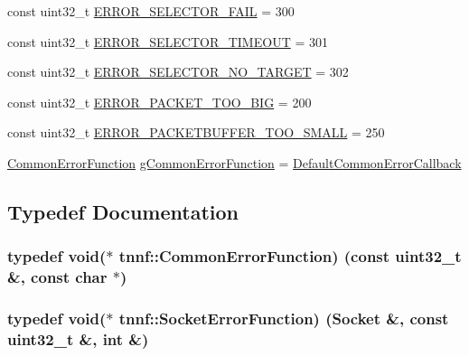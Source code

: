 \begin{DoxyCompactItemize}
\item 
const uint32\+\_\+t \hyperlink{namespacetnnf_af662f0c35b0eb75729eb6ae1ae3e48df}{E\+R\+R\+O\+R\+\_\+\+S\+E\+L\+E\+C\+T\+O\+R\+\_\+\+F\+A\+I\+L} = 300
\item 
const uint32\+\_\+t \hyperlink{namespacetnnf_a1e6246ce42ad3d14b27cddb40dbe2e92}{E\+R\+R\+O\+R\+\_\+\+S\+E\+L\+E\+C\+T\+O\+R\+\_\+\+T\+I\+M\+E\+O\+U\+T} = 301
\item 
const uint32\+\_\+t \hyperlink{namespacetnnf_a2a52f505fa0fc0f44aa4277b2f2a4eaa}{E\+R\+R\+O\+R\+\_\+\+S\+E\+L\+E\+C\+T\+O\+R\+\_\+\+N\+O\+\_\+\+T\+A\+R\+G\+E\+T} = 302
\item 
const uint32\+\_\+t \hyperlink{namespacetnnf_aad4f66acf18647decd893947c7ddaea7}{E\+R\+R\+O\+R\+\_\+\+P\+A\+C\+K\+E\+T\+\_\+\+T\+O\+O\+\_\+\+B\+I\+G} = 200
\item 
const uint32\+\_\+t \hyperlink{namespacetnnf_a21a988a81b1093f0320978991010a99f}{E\+R\+R\+O\+R\+\_\+\+P\+A\+C\+K\+E\+T\+B\+U\+F\+F\+E\+R\+\_\+\+T\+O\+O\+\_\+\+S\+M\+A\+L\+L} = 250
\item 
\hyperlink{namespacetnnf_a8582fd7399bd6b4f1bc80f600e0dc889}{Common\+Error\+Function} \hyperlink{namespacetnnf_a09f00feabd8f2363f85eaa64d9f0a1bb}{g\+Common\+Error\+Function} = \hyperlink{namespacetnnf_a38b2a35754cac26ac7f6e0ba5d56d880}{Default\+Common\+Error\+Callback}
\end{DoxyCompactItemize}


\subsection{Typedef Documentation}
\hypertarget{namespacetnnf_a8582fd7399bd6b4f1bc80f600e0dc889}{}
\subsubsection[{Common\+Error\+Function}]{\setlength{\rightskip}{0pt plus 5cm}typedef void($\ast$ tnnf\+::\+Common\+Error\+Function) (const uint32\+\_\+t \&, const char $\ast$)}\label{namespacetnnf_a8582fd7399bd6b4f1bc80f600e0dc889}
\hypertarget{namespacetnnf_ab346f9859b3d467cfa2b596cc075e954}{}
\subsubsection[{Socket\+Error\+Function}]{\setlength{\rightskip}{0pt plus 5cm}typedef void($\ast$ tnnf\+::\+Socket\+Error\+Function) ({\bf Socket} \&, const uint32\+\_\+t \&, int \&)}\label{namespacetnnf_ab346f9859b3d467cfa2b596cc075e954}


